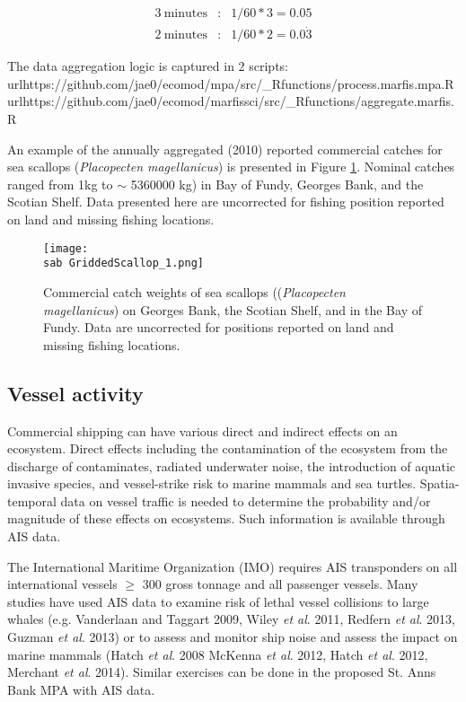 \documentclass[letterpaper,portrait,11pt]{scrartcl}
\numberwithin{equation}{section}		%
\numberwithin{figure}{section}		%
\numberwithin{table}{section}				%
\newcommand{\ecomod}{\string~/ecomod_data/}   %
\newcommand{\sab}{\ecomod/mpa/sab/}   %
\begin{document}
\begin{eqnarray*}
3 \: \text{minutes} &:& 1/60*3 = 0.05 \\
2 \: \text{minutes} &:& 1/60*2 = 0.0\dot{3}
\end{eqnarray*}


The data aggregation logic is captured in 2 scripts: 
\\url{https://github.com/jae0/ecomod/mpa/src/\_Rfunctions/process.marfis.mpa.R} 
\\url{https://github.com/jae0/ecomod/marfissci/src/\_Rfunctions/aggregate.marfis.R}


An example of the annually aggregated (2010) reported commercial catches for sea scallops (\textit{Placopecten magellanicus}) is presented in Figure \ref{fig:Scallop}.  Nominal catches ranged from 1kg to $\sim$ 5360000 kg) in Bay of Fundy, Georges Bank, and the Scotian Shelf.  Data presented here are uncorrected for fishing position reported on land and missing fishing locations.  

\begin{figure}[h]
	\label{fig:Scallop}
	\centering
	\texttt{[image: \\sab GriddedScallop\_1.png]}
	\caption{Commercial catch weights of sea scallops ((\textit{Placopecten magellanicus}) on Georges Bank, the Scotian Shelf, and in the Bay of Fundy.  Data are uncorrected for positions reported on land and missing fishing locations.}
\end{figure}



\clearpage

\subsection{Vessel activity}
Commercial shipping can have various direct and indirect effects on an ecosystem. Direct effects including the contamination of the ecosystem from the discharge of contaminates, radiated underwater noise, the introduction of aquatic invasive species, and vessel-strike risk to marine mammals and sea turtles.  Spatia-temporal data on vessel traffic is needed to determine the probability and/or magnitude of these effects on ecosystems.  Such information is available through AIS data.  

The International Maritime Organization (IMO) requires AIS transponders on all international vessels $\geq$ 300 gross tonnage and all passenger vessels.  Many studies have used AIS data to examine risk of lethal vessel collisions to large whales (e.g. Vanderlaan and Taggart 2009, Wiley \textit{et al}. 2011, Redfern \textit{et al}. 2013,  Guzman \textit{et al}. 2013) or to assess and monitor ship noise and assess the impact on marine mammals (Hatch \textit{et al}. 2008 McKenna \textit{et al}. 2012,  Hatch \textit{et al}. 2012, Merchant \textit{et al}. 2014).    Similar exercises can be done in the proposed St. Anns Bank MPA with AIS data. 
\end{document}
